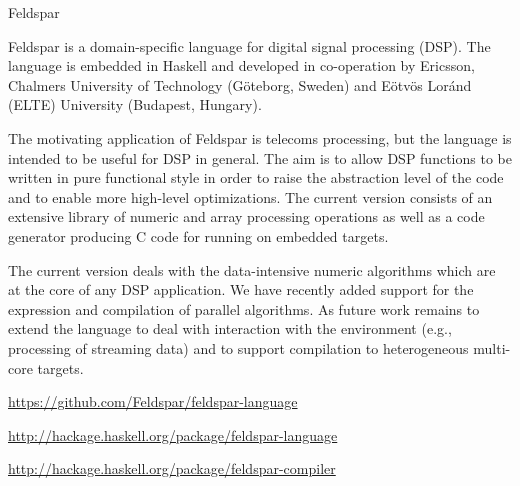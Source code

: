 \begin{hcarentry}[updated]{Feldspar}
\label{feldspar}
\makeheader

Feldspar is a domain-specific language for digital signal processing (DSP). The
language is embedded in Haskell and developed in co-operation by Ericsson,
Chalmers University of Technology (G\"oteborg, Sweden) and E\"otv\"os Lor\'and
(ELTE) University (Budapest, Hungary).

The motivating application of Feldspar is telecoms processing, but the language
is intended to be useful for DSP in general. The aim is to allow DSP functions
to be written in pure functional style in order to raise the abstraction level of
the code and to enable more high-level optimizations. The current version consists
of an extensive library of numeric and array processing operations as well as a
code generator producing C code for running on embedded targets.

The current version deals with the data-intensive numeric algorithms which are
at the core of any DSP application. We have recently added support for the expression
and compilation of parallel algorithms. As future work remains to extend the language
to deal with interaction with the environment (e.g., processing of streaming data) and
to support compilation to heterogeneous multi-core targets.

\FurtherReading
\begin{compactitem}
\item \url{https://github.com/Feldspar/feldspar-language}
\item \url{http://hackage.haskell.org/package/feldspar-language}
\item \url{http://hackage.haskell.org/package/feldspar-compiler}
\end{compactitem}
\end{hcarentry}

